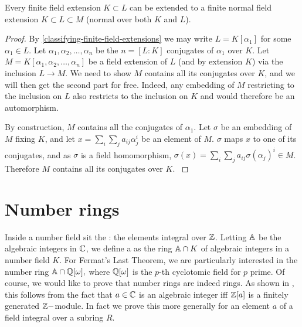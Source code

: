 

\begin{theorem}
Every finite field extension $K\subset L$ can be extended to a finite normal field extension $K\subset L \subset M$ (normal over both $K$ and $L$).
\end{theorem}
\begin{proof}
By \cref{classifying-finite-field-extensions} we may write $L=K[\alpha_1]$ for some $\alpha_1 \in L$. Let $\alpha_1,\alpha_2,\dots,\alpha_n$ be the $n=[L:K]$ conjugates of $\alpha_1$ over $K$. Let $M=K[\alpha_1,\alpha_2,\dots,\alpha_n]$ be a field extension of $L$ (and by extension $K$) via the inclusion $L\rightarrow M$. We need to show $M$ contains all its conjugates over $K$, and we will then get the second part for free. Indeed, any embedding of $M$ restricting to the inclusion on $L$ also restricts to the inclusion on $K$ and would therefore be an automorphism.

By construction, $M$ contains all the conjugates of $\alpha_1$. Let $\sigma$ be an embedding of $M$ fixing $K$, and let $x=\sum_i \sum_j a_{ij}\alpha_j^i$ be an element of $M$. $\sigma$ maps $x$ to one of its conjugates, and as $\sigma$ is a field homomorphism, $\sigma(x)=\sum_i \sum_j a_{ij}\sigma(\alpha_j)^i\in M$. Therefore $M$ contains all its conjugates over $K$. \cite{NumberFields}
\end{proof}

\section{Number rings}
Inside a number field sit the : the elements integral over $\mathbb{Z}$. Letting $\mathbb{A}$ be the algebraic integers in $\mathbb{C}$, we define a  as the ring $\mathbb{A}\cap K$ of algebraic integers in a number field $K$. For Fermat's Last Theorem, we are particularly interested in the number ring $\mathbb{A}\cap \mathbb{Q}[\omega],$ where $\mathbb{Q}[\omega]$ is the $p$-th cyclotomic field for $p$ prime. Of course, we would like to prove that number rings are indeed rings. As shown in \cite{NumberFields}, this follows from the fact that $a\in \mathbb{C}$ is an algebraic integer iff $\mathbb{Z}[a]$ is a finitely generated $\mathbb{Z}-$module. In fact we prove this more generally for an element $a$ of a field integral over a subring $R.$

